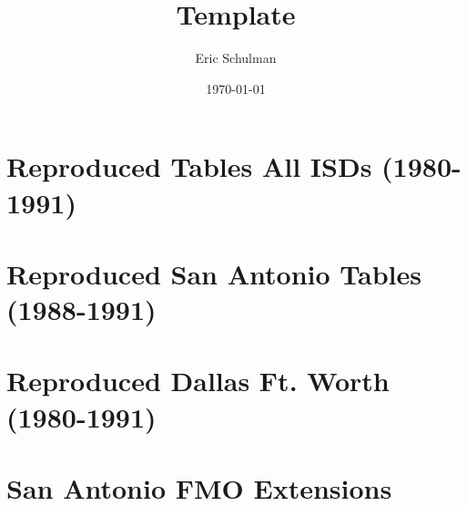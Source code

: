 \documentclass{article}
\title{Template}
\author{Eric Schulman}
\date{\today}
\begin{document}
\section{Reproduced Tables All ISDs (1980-1991)}





\pagebreak

\section{Reproduced San Antonio Tables (1988-1991)}





\pagebreak

\section{Reproduced Dallas Ft. Worth (1980-1991)}





\pagebreak

\section{San Antonio FMO Extensions}




\end{document}
